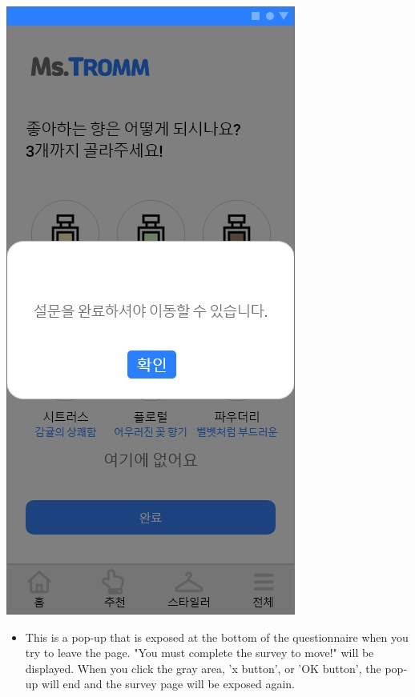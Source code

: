 \documentclass[conference]{IEEEtran}
\begin{document}
\begin{enumerate}
\begin{enumerate}
            \centerline{\includegraphics[scale=0.32]{assets/설문지6.jpg}}
    \begin{itemize}
        \item[]  This is a pop-up that is exposed at the bottom of the questionnaire when you try to leave the page. "You must complete the survey to move!" will be displayed. When you click the gray area, 'x button', or 'OK button', the pop-up will end and the survey page will be exposed again.\\ \\ \\
        \end{itemize} 


\end{enumerate}
\end{enumerate}
\end{document}
